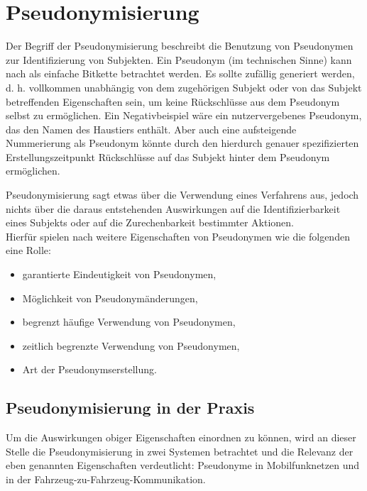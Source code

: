 \section{Pseudonymisierung}

\label{sec_state_pseudonymity}

Der Begriff der Pseudonymisierung beschreibt die Benutzung von Pseudonymen zur Identifizierung von Subjekten. Ein Pseudonym (im technischen Sinne) kann nach \cite{pfitzmann2010} als einfache Bitkette betrachtet werden. Es sollte zufällig generiert werden, d. h. vollkommen unabhängig von dem zugehörigen Subjekt oder von das Subjekt betreffenden Eigenschaften sein, um keine Rückschlüsse aus dem Pseudonym selbst zu ermöglichen. Ein Negativbeispiel wäre ein nutzervergebenes Pseudonym, das den Namen des Haustiers enthält. Aber auch eine aufsteigende Nummerierung als Pseudonym könnte durch den hierdurch genauer spezifizierten Erstellungszeitpunkt Rückschlüsse auf das Subjekt hinter dem Pseudonym ermöglichen.

Pseudonymisierung sagt etwas über die Verwendung eines Verfahrens aus, jedoch nichts über die daraus entstehenden Auswirkungen auf die Identifizierbarkeit eines Subjekts oder auf die Zurechenbarkeit bestimmter Aktionen.\\
Hierfür spielen nach \cite{pfitzmann2001} weitere Eigenschaften von Pseudonymen wie die folgenden eine Rolle:
\begin{itemize}
  \item garantierte Eindeutigkeit von Pseudonymen,
  \item Möglichkeit von Pseudonymänderungen,
  \item begrenzt häufige Verwendung von Pseudonymen,
  \item zeitlich begrenzte Verwendung von Pseudonymen,
  \item Art der Pseudonymserstellung.
\end{itemize}

\subsection{Pseudonymisierung in der Praxis}

Um die Auswirkungen obiger Eigenschaften einordnen zu können, wird an dieser Stelle die Pseudonymisierung in zwei Systemen betrachtet und die Relevanz der eben genannten Eigenschaften verdeutlicht: Pseudonyme in Mobilfunknetzen und in der Fahrzeug-zu-Fahrzeug-Kommunikation. 

